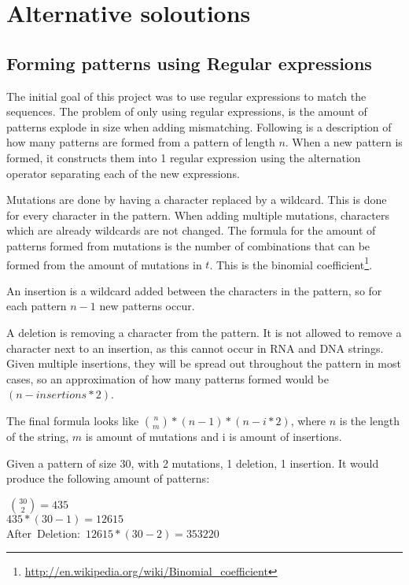 \section{Alternative soloutions}
\subsection{Forming patterns using Regular expressions}
The initial goal of this project was to use regular expressions to match the sequences. The problem of only using regular expressions, is the amount of patterns explode in size when adding mismatching. Following is a description of how many patterns are formed from a pattern of length $n$. When a new pattern is formed, it constructs them into 1 regular expression using the alternation operator separating each of the new expressions. 

Mutations are done by having a character replaced by a wildcard. This is done for every character in the pattern. When adding multiple mutations, characters which are already wildcards are not changed. The formula for the amount of patterns formed from mutations is the number of combinations that can be formed from the amount of mutations in $t$. This is the binomial coefficient\footnote{\url{http://en.wikipedia.org/wiki/Binomial_coefficient}}. 

An insertion is a wildcard added between the characters in the pattern, so for each pattern $n-1$ new patterns occur.

A deletion is removing a character from the pattern. It is not allowed to remove a character next to an insertion, as this cannot occur in RNA and DNA strings. Given multiple insertions, they will be spread out throughout the pattern in most cases, so an approximation of how many patterns formed would be $(n - insertions * 2)$.

The final formula looks like ${n \choose m}*(n-1)*(n-i*2)$, where $n$ is the length of the string, $m$ is amount of mutations and i is amount of insertions.

\begin{myex}\label{altreg}
Given a pattern of size 30, with 2 mutations, 1 deletion, 1 insertion. It would produce the following amount of patterns: \\
\begin{center}
 $~{30 \choose 2} = 435$\\
 $435 * (30-1) = 12615$\\
After~Deletion:~$12615*(30-2) = 353220$
\end{center}
\end{myex}

